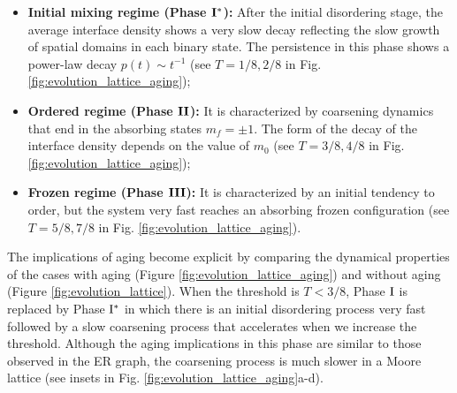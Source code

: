 \begin{itemize}
    \item \textbf{Initial mixing regime (Phase ${\rm {\bf I}}^{*}$):}  After the initial disordering stage, the average interface density shows a very slow decay reflecting the slow growth of spatial domains in each binary state. The persistence in this phase shows a power-law decay $p(t) \sim t^{-1}$ (see $T = 1/8,2/8$ in Fig. \ref{fig:evolution_lattice_aging});
    \item \textbf{Ordered regime (Phase ${\rm {\bf II}}$):} It is characterized by coarsening dynamics that end in the absorbing states $m_f = \pm 1$. The form of the decay of the interface density depends on the value of $m_0$ (see $T = 3/8,4/8$ in Fig. \ref{fig:evolution_lattice_aging});
    \item \textbf{Frozen regime (Phase ${\rm {\bf III}}$):} It is characterized by an initial tendency to order, but the system very fast reaches an absorbing frozen configuration (see $T = 5/8,7/8$ in Fig. \ref{fig:evolution_lattice_aging}).
\end{itemize}

The implications of aging become explicit by comparing the dynamical properties of the cases with aging (Figure \ref{fig:evolution_lattice_aging}) and without aging (Figure \ref{fig:evolution_lattice}). When the threshold is $T<3/8$, Phase ${\rm I}$ is replaced by Phase ${\rm I}^{*}$ in which there is an initial disordering process very fast followed by a slow coarsening process that accelerates when we increase the threshold. Although the aging implications in this phase are similar to those observed in the ER graph, the coarsening process is much slower in a Moore lattice (see insets in Fig. \ref{fig:evolution_lattice_aging}a-d).

